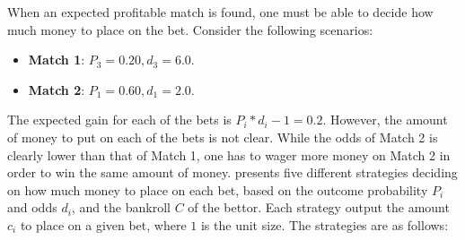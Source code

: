 When an expected profitable match is found, one must be able to decide how much money to place on the bet. Consider the following scenarios:
\begin{itemize}
    \item \textbf{Match 1}: $P_{3} = 0.20, d_{3} = 6.0$.
    \item \textbf{Match 2}: $P_{1} = 0.60, d_{1} = 2.0$.
\end{itemize}
The expected gain for each of the bets is $P_{i} * d_{i} - 1 = 0.2$. However, the amount of money to put on each of the bets is not clear. While the odds of Match 2 is clearly lower than that of Match 1, one has to wager more money on Match 2 in order to win the same amount of money. \citet{bib:langseth-2013} presents five different strategies deciding on how much money to place on each bet, based on the outcome probability $P_{i}$ and odds $d_{i}$, and the bankroll $C$ of the bettor. Each strategy output the amount $c_{i}$ to place on a given bet, where $1$ is the unit size. The strategies are as follows:
